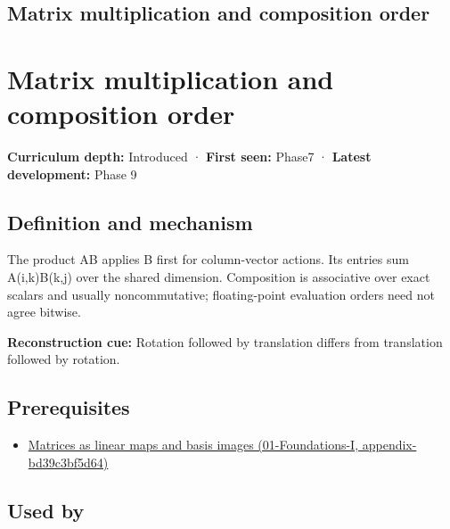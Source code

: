 \hypertarget{appendix-ab31ef447dbf}{}
\section*{Matrix multiplication and composition order}
\chapter{Matrix multiplication and composition order}\label{appendix-ab31ef447dbf-matrix-multiplication-and-composition-order}

\textbf{Curriculum depth:} Introduced · \textbf{First seen:} Phase7 · \textbf{Latest development:} Phase 9

\section{Definition and mechanism}\label{appendix-ab31ef447dbf-definition-and-mechanism}

The product AB applies B first for column-vector actions. Its entries sum A(i,k)B(k,j) over the shared dimension. Composition is associative over exact scalars and usually noncommutative; floating-point evaluation orders need not agree bitwise.

\textbf{Reconstruction cue:} Rotation followed by translation differs from translation followed by rotation.

\section{Prerequisites}\label{appendix-ab31ef447dbf-prerequisites}

\begin{itemize}
\tightlist
\item
  \href{../01-Foundations-I/main.pdf\#nameddest=appendix-bd39c3bf5d64}{Matrices as linear maps and basis images (01-Foundations-I, appendix-bd39c3bf5d64)}
\end{itemize}

\section{Used by}\label{appendix-ab31ef447dbf-used-by}

